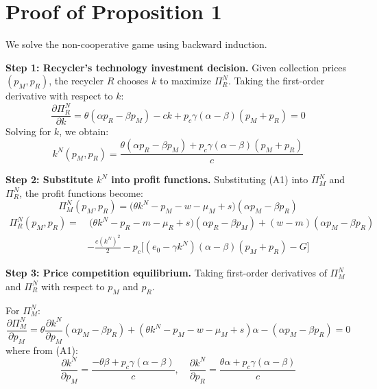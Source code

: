 \documentclass[authoryear,preprint,review,times,10pt]{elsarticle}
\begin{document}
\appendix

\appendix
\section{Proof of Proposition 1}

We solve the non-cooperative game using backward induction.

\textbf{Step 1: Recycler's technology investment decision.} Given collection prices $(p_M, p_R)$, the recycler $R$ chooses $k$ to maximize $\Pi_R^N$. Taking the first-order derivative with respect to $k$:
\begin{equation}
\frac{\partial \Pi_R^N}{\partial k} = \theta(\alpha p_R - \beta p_M) - ck + p_c \gamma (\alpha - \beta)(p_M + p_R) = 0
\end{equation}
Solving for $k$, we obtain:
\begin{equation}
k^N(p_M, p_R) = \frac{\theta(\alpha p_R - \beta p_M) + p_c \gamma (\alpha - \beta)(p_M + p_R)}{c}
\tag{A1}
\end{equation}

\textbf{Step 2: Substitute $k^N$ into profit functions.} Substituting (A1) into $\Pi_M^N$ and $\Pi_R^N$, the profit functions become:
\begin{equation}
\Pi_M^N(p_M, p_R) = \big(\theta k^N - p_M - w - \mu_M + s\big)(\alpha p_M - \beta p_R)
\end{equation}
\begin{equation}
\begin{aligned}
\Pi_R^N(p_M, p_R) =&\ \big(\theta k^N - p_R - m - \mu_R + s\big)(\alpha p_R - \beta p_M) + (w - m)(\alpha p_M - \beta p_R) \\
&- \frac{c (k^N)^2}{2} - p_c\big[(e_0 - \gamma k^N)(\alpha - \beta)(p_M + p_R) - G\big]
\end{aligned}
\tag{A2}
\end{equation}

\textbf{Step 3: Price competition equilibrium.} Taking first-order derivatives of $\Pi_M^N$ and $\Pi_R^N$ with respect to $p_M$ and $p_R$.

For $\Pi_M^N$:
\begin{equation}
\frac{\partial \Pi_M^N}{\partial p_M} = \theta\frac{\partial k^N}{\partial p_M}(\alpha p_M - \beta p_R) + (\theta k^N - p_M - w - \mu_M + s)\alpha - (\alpha p_M - \beta p_R) = 0
\tag{A3}
\end{equation}
where from (A1):
\begin{equation}
\frac{\partial k^N}{\partial p_M} = \frac{-\theta\beta + p_c \gamma (\alpha - \beta)}{c}, \quad \frac{\partial k^N}{\partial p_R} = \frac{\theta \alpha + p_c \gamma (\alpha - \beta)}{c}
\end{equation}
\end{document}
